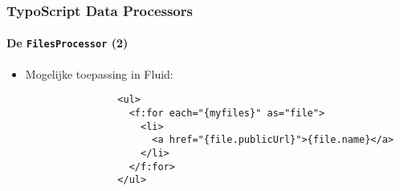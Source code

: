 \begin{frame}[fragile]
	\frametitle{TypoScript Data Processors}
	\framesubtitle{De \texttt{FilesProcessor} (2)}

	\lstset{basicstyle=\tiny\ttfamily}

	\begin{itemize}

		\item Mogelijke toepassing in Fluid:

			\begin{lstlisting}
				<ul>
				  <f:for each="{myfiles}" as="file">
				    <li>
				      <a href="{file.publicUrl}">{file.name}</a>
				    </li>
				  </f:for>
				</ul>
			\end{lstlisting}

	\end{itemize}

\end{frame}


